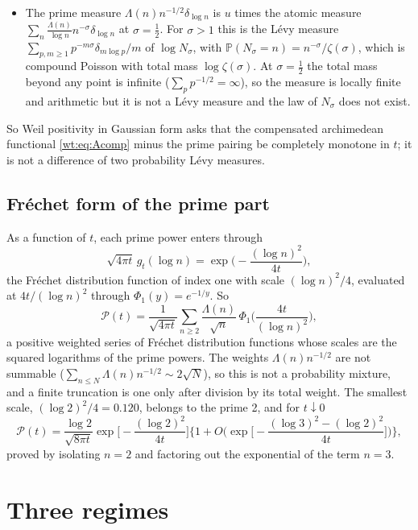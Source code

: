 \begin{resultpar}
\begin{itemize}
\item The prime measure $\Lambda(n)n^{-1/2}\delta_{\log n}$ is $u$ times the atomic measure $\sum_n\frac{\Lambda(n)}{\log n}n^{-\sigma}\delta_{\log n}$ at $\sigma=\frac12$. For $\sigma>1$ this is the L\'evy measure $\sum_{p,m\ge1}p^{-m\sigma}\delta_{m\log p}/m$ of $\log N_\sigma$, with $\mathbb P(N_\sigma=n)=n^{-\sigma}/\zeta(\sigma)$, which is compound Poisson with total mass $\log\zeta(\sigma)$. At $\sigma=\frac12$ the total mass beyond any point is infinite ($\sum_pp^{-1/2}=\infty$), so the measure is locally finite and arithmetic but it is not a L\'evy measure and the law of $N_\sigma$ does not exist.
\end{itemize}\end{resultpar}
So Weil positivity in Gaussian form asks that the compensated archimedean functional \eqref{wt:eq:Acomp} minus the prime pairing be completely monotone in $t$; it is not a difference of two probability L\'evy measures.

\subsection*{Fr\'echet form of the prime part}
\begin{resultpar}\label{wt:res:frechet}
As a function of $t$, each prime power enters through
\[
\sqrt{4\pi t}\,g_t(\log n)=\exp\!\Big(-\frac{(\log n)^2}{4t}\Big),
\]
the Fr\'echet distribution function of index one with scale $(\log n)^2/4$, evaluated at $4t/(\log n)^2$ through $\Phi_1(y)=e^{-1/y}$. So
\[
\mathcal P(t)=\frac1{\sqrt{4\pi t}}\sum_{n\ge2}\frac{\Lambda(n)}{\sqrt n}\,\Phi_1\!\Big(\frac{4t}{(\log n)^2}\Big),
\]
a positive weighted series of Fr\'echet distribution functions whose scales are the squared logarithms of the prime powers. The weights $\Lambda(n)n^{-1/2}$ are not summable ($\sum_{n\le N}\Lambda(n)n^{-1/2}\sim2\sqrt N$), so this is not a probability mixture, and a finite truncation is one only after division by its total weight. The smallest scale, $(\log2)^2/4=0.120$, belongs to the prime 2, and for $t\downarrow0$
\[
\mathcal P(t)=\frac{\log2}{\sqrt{8\pi t}}\exp\Big[-\frac{(\log2)^2}{4t}\Big]\Big\{1+O\Big(\exp\Big[-\frac{(\log3)^2-(\log2)^2}{4t}\Big]\Big)\Big\},
\]
proved by isolating $n=2$ and factoring out the exponential of the term $n=3$.\end{resultpar}

\section{Three regimes}\label{wt:sec:regimes}

